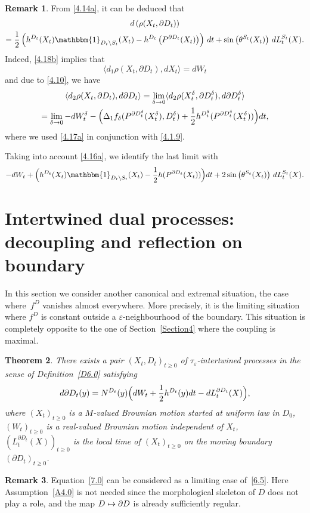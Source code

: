 \documentclass[10pt]{amsart}
\let\backslash\setminus
\newcommand\mto{\mathchoice{\longmapsto}{\mapsto}{\mapsto}{\mapsto}}
\theoremstyle{plain}
\newtheorem{thm}{Theorem}[section]
\theoremstyle{definition}
\newtheorem{remark}[thm]{Remark}
\newcommand{\bq}{\begin{equation*}}
\newcommand{\eq}{\end{equation*}}
\newcommand{\un}{\mathbbm{1}}
\let\f\frac
\let\d\delta
\let\e\varepsilon
\let\pa\partial
\begin{document}
\begin{remark}
From \eqref{4.14a}, it can be deduced that
\begin{multline}
d\left(\rho(X_t,\partial D_t)\right)\\
=
\f12\left(h^{D_t}(X_t)\un_{D_t \backslash S_t}(X_t)-h^{D_t}\left(P^{\partial D_t}(X_t)\right)\right)\, dt +\sin\left(\theta^{S_t}(X_t)\right)\,dL_t^{S_t}(X).
\end{multline}
Indeed, \eqref{4.18b} implies that
\bq \langle d_1\rho (X_t,\partial D_t), dX_t\rangle= dW_t\eq
and due to \eqref{4.10}, we have
\begin{multline*}
\langle d_2\rho (X_t,\partial D_t), d\partial D_t\rangle
=\lim_{\d\to0}\langle d_2\rho (X_t^\d,\partial D_t^\d), d\partial D_t^\d\rangle
\\
=\lim_{\d\to0}
-dW^\d_t-\Bigl(\Delta_1f_\d(P^{\pa D_t^\d}(X^\d_t),D_t^\d)+\f12h^{D_t^\d}(P^{\pa D_t^\d}(X^\d_t))\Bigr)dt,
\end{multline*}
where we used
\eqref{4.17a} in conjunction with \eqref{4.1.9}.
\par Taking into account \eqref{4.16a}, we identify the last limit with
\bq
-dW_t+\Bigl(h^{D_t}(X_t)\un_{D_t \backslash S_t}(X_t)-\f12h(P^{\pa D_t}(X_t))\Bigr)dt +2\sin\left(\theta^{S_t}(X_t)\right)\,dL_t^{S_t}(X).
\eq
\end{remark}

\section{Intertwined dual processes: decoupling and reflection on boundary}
\label{Section7}

In this section we consider another canonical and extremal situation, the case where~$f^D$ vanishes almost everywhere. More precisely, it is the limiting situation where $f^D$ is constant outside a $\e$-neighbourhood of the boundary. This situation is completely opposite to the one of Section~\ref{Section4} where the coupling is maximal.

\begin{thm}
\label{T7.1}
There exists a pair $(X_t,D_t)_{t\ge 0}$ of $\tau_\e$-intertwined processes in the sense of Definition~\ref{D6.0} satisfying
\begin{equation}
\label{7.0}
d\partial D_t(y)=N^{D_t}(y)\Bigl( dW_t +\f12 h^{D_t}(y)dt-dL^{\partial D_t}_t(X)\Bigr),
\end{equation}
where $(X_t)_{t\ge0}$ is a $M$-valued Brownian motion started at uniform law in $D_0$, $(W_t)_{t\ge0}$ is a real-valued Brownian motion independent of $X_t$, $(L^{\partial D_t}_t(X))_{t\ge0}$ is the local time of $(X_t)_{t\ge0}$ on the moving boundary $(\partial D_t)_{t\ge0}$.
\end{thm}
\begin{remark}
Equation~\eqref{7.0} can be considered as a limiting case of~\eqref{6.5}. Here Assumption~\ref{A4.0} is not needed since the morphological skeleton of $D$ does not play a role, and the map $D\mto \partial D$ is already sufficiently regular.
\end{remark}
\end{document}
